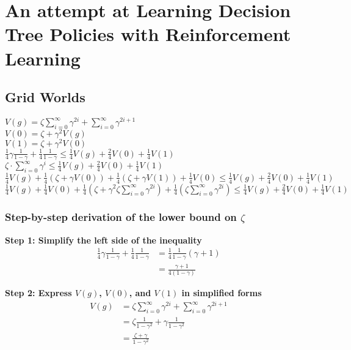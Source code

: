\chapter{An attempt at Learning Decision Tree Policies with Reinforcement Learning}
\section{Grid Worlds}

$V(g) = \zeta\sum_{i=0}^\infty\gamma^{2i} + \sum_{i=0}^\infty\gamma^{2i + 1}$\\
$V(0) = \zeta + \gamma^2V(g)$\\
$V(1) = \zeta + \gamma^2V(0)$\\
$\frac{1}{4}\gamma\frac{1}{1-\gamma} + \frac{1}{4}\frac{1}{1-\gamma} \leq \frac{1}{4}V(g) + \frac{2}{4}V(0) + \frac{1}{4}V(1)$\\
$\zeta\cdot\sum_{i=0}^\infty \gamma^i \leq \frac{1}{4}V(g) + \frac{2}{4}V(0) + \frac{1}{4}V(1)$\\
$\frac{1}{4}V(g) + \frac{1}{4}(\zeta + \gamma V(0)) + \frac{1}{4}(\zeta + \gamma V(1)) +\frac{1}{4} V(0) \leq \frac{1}{4}V(g) + \frac{2}{4}V(0) + \frac{1}{4}V(1)$\\
$\frac{1}{4}V(g) + \frac{1}{4}V(0) + \frac{1}{4}(\zeta+\gamma^{2}\zeta\sum_{i=0}^\infty\gamma^{2i}) + \frac{1}{4}(\zeta\sum_{i=0}^\infty\gamma^{2i}) \leq \frac{1}{4}V(g) + \frac{2}{4}V(0) + \frac{1}{4}V(1)$\\

\subsection{Step-by-step derivation of the lower bound on $\zeta$}

\textbf{Step 1: Simplify the left side of the inequality}
\begin{align}
\frac{1}{4}\gamma\frac{1}{1-\gamma} + \frac{1}{4}\frac{1}{1-\gamma} &= \frac{1}{4}\frac{1}{1-\gamma}(\gamma + 1)\\
&= \frac{\gamma + 1}{4(1-\gamma)}
\end{align}

\textbf{Step 2: Express $V(g)$, $V(0)$, and $V(1)$ in simplified forms}
\begin{align}
V(g) &= \zeta\sum_{i=0}^\infty\gamma^{2i} + \sum_{i=0}^\infty\gamma^{2i + 1}\\
&= \zeta \frac{1}{1-\gamma^2} + \gamma \frac{1}{1-\gamma^2}\\
&= \frac{\zeta + \gamma}{1-\gamma^2}
\end{align}

